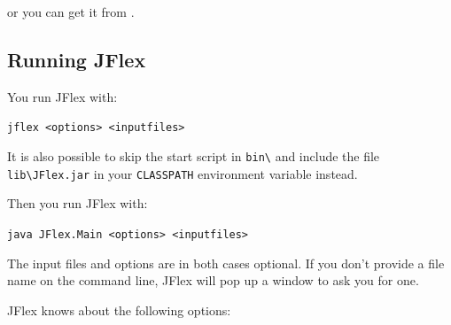 \documentclass[11pt]{scrartcl}
\begin{document}
or you can get it from .

\subsection{Running JFlex}
You run JFlex with:

\texttt{jflex <options> <inputfiles>}

It is also possible to skip the start script in \verb+bin\+
and include the file \verb+lib\JFlex.jar+
in your \texttt{CLASSPATH} environment variable instead.

Then you run JFlex with:

\texttt{java JFlex.Main <options> <inputfiles>}

The input files and options are in both cases optional. If you don't provide a file name on
the command line, JFlex will pop up a window to ask you for one.

JFlex knows about the following options:
\end{document}
